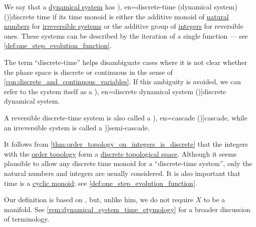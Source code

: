 \begin{definition}\label{def:discrete_dynamical_system}\mimprovised
  We say that a \hyperref[def:dynamical_system]{dynamical system} has \term[ru=(динамическая система с) дискретным временем (\cite[10]{Юмагулов2015ДинамическиеСистемы}), en=discrete-time (dynamical system) (\cite[1]{Rozikov2012MultiDimensionalTimeDynamicalSystem})]{discrete time} if its time monoid is either the additive monoid of \hyperref[def:natural_numbers]{natural numbers} for \hyperref[def:reversible_dynamical_system]{irreversible systems} or the additive group of \hyperref[def:integers]{integers} for reversible ones. These systems can be described by the iteration of a single function --- see \cref{def:one_step_evolution_function}.

  The term \enquote{discrete-time} helps disambiguate cases where it is not clear whether the phase space is discrete or continuous in the sense of \cref{con:discrete_and_continuous_variables}. If this ambiguity is avoided, we can refer to the system itself as a \term[ru=дискретная динамическая система (\cite[10]{Юмагулов2015ДинамическиеСистемы}), en=discrete dynamical system (\cite[363]{Rozikov2012MultiDimensionalTimeDynamicalSystem})]{discrete dynamical system}.

  A reversible discrete-time system is also called a \term[ru=каскада (\cite[10]{Юмагулов2015ДинамическиеСистемы}), en=cascade (\cite[363]{Rozikov2012MultiDimensionalTimeDynamicalSystem})]{cascade}, while an irreversible system is called a \term[en=semi-cascade (\cite[363]{Rozikov2012MultiDimensionalTimeDynamicalSystem})]{semi-cascade}.
\end{definition}
\begin{comments}
  \item It follows from \cref{thm:order_topology_on_integers_is_discrete} that the integers with the \hyperref[def:order_topology]{order topology} form a \hyperref[def:discrete_topology]{discrete topological space}. Although it seems plausible to allow any discrete time monoid for a \enquote{discrete-time system}, only the natural numbers and integers are usually considered. It is also important that time is a \hyperref[def:cyclic_monoid]{cyclic monoid}; see \cref{def:one_step_evolution_function}.

  \item Our definition is based on , but, unlike him, we do not require \( X \) to be a manifold. See \cref{rem:dynamical_system_time_etymology} for a broader discussion of terminology.
\end{comments}

